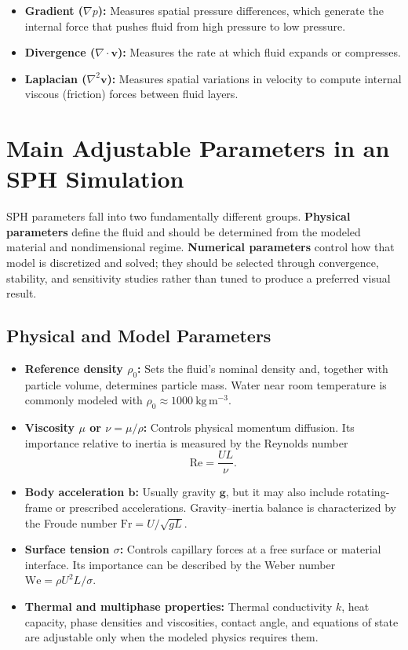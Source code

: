\documentclass[11pt]{article}
\begin{document}
\begin{itemize}
    \item \textbf{Gradient ($\nabla p$):} Measures spatial pressure
    differences, which generate the internal force that pushes fluid from high
    pressure to low pressure.
    \item \textbf{Divergence ($\nabla \cdot \mathbf{v}$):} Measures the rate at
    which fluid expands or compresses.
    \item \textbf{Laplacian ($\nabla^2 \mathbf{v}$):} Measures spatial
    variations in velocity to compute internal viscous (friction) forces
    between fluid layers.
\end{itemize}

\section{Main Adjustable Parameters in an SPH Simulation}

SPH parameters fall into two fundamentally different groups.
\textbf{Physical parameters} define the fluid and should be determined from the
modeled material and nondimensional regime. \textbf{Numerical parameters}
control how that model is discretized and solved; they should be selected
through convergence, stability, and sensitivity studies rather than tuned to
produce a preferred visual result.

\subsection{Physical and Model Parameters}

\begin{itemize}
    \item \textbf{Reference density $\rho_0$:} Sets the fluid's nominal
    density and, together with particle volume, determines particle mass.
    Water near room temperature is commonly modeled with
    $\rho_0\approx1000\ \mathrm{kg\,m^{-3}}$.
    \item \textbf{Viscosity $\mu$ or $\nu=\mu/\rho$:} Controls physical
    momentum diffusion. Its importance relative to inertia is measured by the
    Reynolds number
    \begin{equation}
        \mathrm{Re}=\frac{UL}{\nu}.
    \end{equation}
    \item \textbf{Body acceleration $\mathbf{b}$:} Usually gravity
    $\mathbf{g}$, but it may also include rotating-frame or prescribed
    accelerations. Gravity--inertia balance is characterized by the Froude
    number $\mathrm{Fr}=U/\sqrt{gL}$.
    \item \textbf{Surface tension $\sigma$:} Controls capillary forces at a
    free surface or material interface. Its importance can be described by the
    Weber number $\mathrm{We}=\rho U^2L/\sigma$.
    \item \textbf{Thermal and multiphase properties:} Thermal conductivity
    $k$, heat capacity, phase densities and viscosities, contact angle, and
    equations of state are adjustable only when the modeled physics requires
    them.
\end{itemize}
\end{document}
